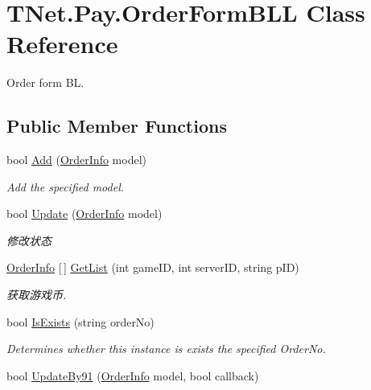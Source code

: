 \hypertarget{class_t_net_1_1_pay_1_1_order_form_b_l_l}{}\section{T\+Net.\+Pay.\+Order\+Form\+B\+LL Class Reference}
\label{class_t_net_1_1_pay_1_1_order_form_b_l_l}


Order form BL.  


\subsection*{Public Member Functions}
\begin{DoxyCompactItemize}
\item 
bool \mbox{\hyperlink{class_t_net_1_1_pay_1_1_order_form_b_l_l_aca0c2ed0708f0e2a5b0d10b826bbcf40}{Add}} (\mbox{\hyperlink{class_t_net_1_1_pay_1_1_order_info}{Order\+Info}} model)
\begin{DoxyCompactList}\small\item\em Add the specified model. \end{DoxyCompactList}\item 
bool \mbox{\hyperlink{class_t_net_1_1_pay_1_1_order_form_b_l_l_a23be1ab41b05a4e569a03f335241ee59}{Update}} (\mbox{\hyperlink{class_t_net_1_1_pay_1_1_order_info}{Order\+Info}} model)
\begin{DoxyCompactList}\small\item\em 修改状态 \end{DoxyCompactList}\item 
\mbox{\hyperlink{class_t_net_1_1_pay_1_1_order_info}{Order\+Info}} \mbox{[}$\,$\mbox{]} \mbox{\hyperlink{class_t_net_1_1_pay_1_1_order_form_b_l_l_adef57874b4407e561135d60c130a04cb}{Get\+List}} (int game\+ID, int server\+ID, string p\+ID)
\begin{DoxyCompactList}\small\item\em 获取游戏币. \end{DoxyCompactList}\item 
bool \mbox{\hyperlink{class_t_net_1_1_pay_1_1_order_form_b_l_l_abb9441c27dba8de83257b614291bc39a}{Is\+Exists}} (string order\+No)
\begin{DoxyCompactList}\small\item\em Determines whether this instance is exists the specified Order\+No. \end{DoxyCompactList}\item 
bool \mbox{\hyperlink{class_t_net_1_1_pay_1_1_order_form_b_l_l_adb4d140843d6eb01eb78c2b319be6bd9}{Update\+By91}} (\mbox{\hyperlink{class_t_net_1_1_pay_1_1_order_info}{Order\+Info}} model, bool callback)

\end{DoxyCompactItemize}
